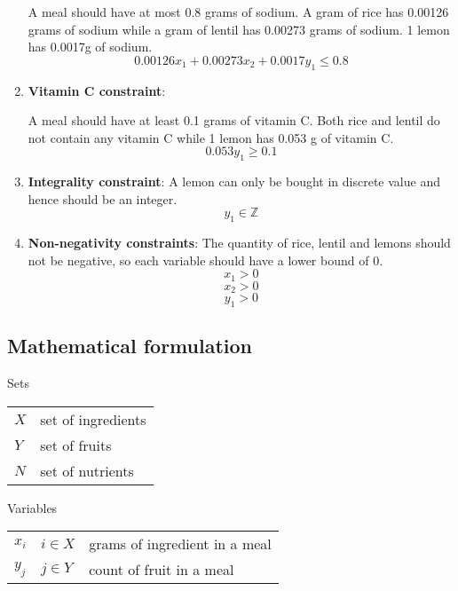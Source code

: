 \documentclass[
]{article}
\begin{document}
\begin{enumerate}
	      A meal should have at most 0.8 grams of sodium. A gram of rice has 0.00126 grams of sodium while a gram of lentil has 0.00273 grams of sodium.
	      1 lemon has 0.0017g of sodium.
	      \begin{equation}
	      	0.00126x_1 + 0.00273x_2 + 0.0017y_1 \le 0.8
	      \end{equation}
	\item \textbf{Vitamin C constraint}:
	      	      
	      A meal should have at least 0.1 grams of vitamin C. Both rice and lentil do not contain any vitamin C while 1 lemon has 0.053 g of vitamin C.
	      \begin{equation}
	      	0.053y_1 \ge 0.1
	      \end{equation}
  \item \textbf{Integrality constraint}:
	      A lemon can only be bought in discrete value and hence should be an integer.
	      \begin{equation}
	      	y_1 \in \mathbb{Z}
	      \end{equation}
  \item \textbf{Non-negativity constraints}:
	      The quantity of rice, lentil and lemons should not be negative, so each variable should have a lower bound of 0.
	      \begin{equation}
	      	x_1 > 0
	      \end{equation}
	      \begin{equation}
	      	x_2 > 0
	      \end{equation}
	      \begin{equation}
	      	y_1 > 0
	      \end{equation}
\end{enumerate}

\hypertarget{mathematical-formulation-2}{%
	\subsection{Mathematical formulation}\label{mathematical-formulation-2}}

Sets\\
\begin{tabular}{ll}
	$X$ & set of ingredients \\
	$Y$ & set of fruits      \\
	$N$ & set of nutrients   \\
\end{tabular}

Variables\\
\begin{tabular}{lll}
	$x_{i}$ & $i\in X$ & grams of ingredient in a meal \\
	$y_{j}$ & $j\in Y$ & count of fruit in a meal      
\end{tabular}
\setcounter{equation}{0}
\end{document}
